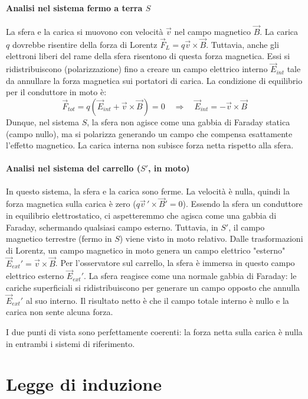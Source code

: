 \documentclass{book}
\begin{document}
\paragraph{Analisi nel sistema fermo a terra $S$}
La sfera e la carica si muovono con velocità $\vec{v}$ nel campo magnetico $\vec{B}$.
La carica $q$ dovrebbe risentire della forza di Lorentz $\vec{F}_L = q\vec{v}\times\vec{B}$.
Tuttavia, anche gli elettroni liberi del rame della sfera risentono di questa forza magnetica. Essi si ridistribuiscono (polarizzazione) fino a creare un campo elettrico interno $\vec{E}_{int}$ tale da annullare la forza magnetica sui portatori di carica.
La condizione di equilibrio per il conduttore in moto è:
$$
\vec{F}_{tot} = q(\vec{E}_{int} + \vec{v}\times\vec{B}) = 0 \quad \Rightarrow \quad \vec{E}_{int} = -\vec{v}\times\vec{B}
$$
Dunque, nel sistema $S$, la sfera non agisce come una gabbia di Faraday statica (campo nullo), ma si polarizza generando un campo che compensa esattamente l'effetto magnetico. La carica interna non subisce forza netta rispetto alla sfera.

\paragraph{Analisi nel sistema del carrello ($S'$, in moto)}
In questo sistema, la sfera e la carica sono ferme. La velocità è nulla, quindi la forza magnetica sulla carica è zero ($q\vec{v}\,'\times\vec{B}' = 0$).
Essendo la sfera un conduttore in equilibrio elettrostatico, ci aspetteremmo che agisca come una gabbia di Faraday, schermando qualsiasi campo esterno.
Tuttavia, in $S'$, il campo magnetico terrestre (fermo in $S$) viene visto in moto relativo. Dalle trasformazioni di Lorentz, un campo magnetico in moto genera un campo elettrico "esterno" $\vec{E}_{ext}' = \vec{v}\times\vec{B}$.
Per l'osservatore sul carrello, la sfera è immersa in questo campo elettrico esterno $\vec{E}_{ext}'$. La sfera reagisce come una normale gabbia di Faraday: le cariche superficiali si ridistribuiscono per generare un campo opposto che annulla $\vec{E}_{ext}'$ al suo interno.
Il risultato netto è che il campo totale interno è nullo e la carica non sente alcuna forza.

I due punti di vista sono perfettamente coerenti: la forza netta sulla carica è nulla in entrambi i sistemi di riferimento.


\section{Legge di induzione}
\end{document}
